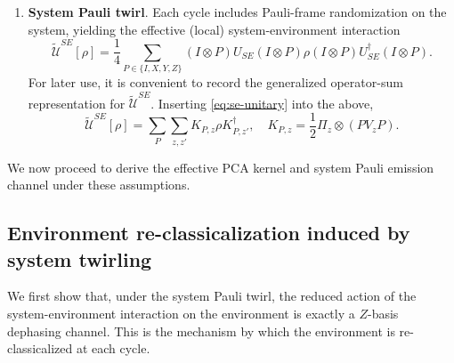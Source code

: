 \documentclass[
    aps,
    prx,
    reprint,
    superscriptaddress,
    longbibliography,
    nofootinbib,
    floatfix,
]{revtex4-2}
\begin{document}
\begin{enumerate}
    \item[(V)] \textbf{System Pauli twirl}.
    Each cycle includes Pauli-frame randomization on the system, yielding the effective (local) system-environment interaction
    \begin{equation}
        \widetilde{\mathcal{U}}^{SE}[\rho] = \frac{1}{4}\sum_{P\in\{I,X,Y,Z\}} (I \otimes P) U_{SE} (I \otimes P) \rho (I \otimes P) U_{SE}^\dagger (I \otimes P).
    \end{equation}
    For later use, it is convenient to record the generalized operator-sum representation for \(\widetilde{\mathcal{U}}^{SE}\). Inserting \cref{eq:se-unitary} into the above,
    \begin{equation}\label{eq:twirled-kraus-ops}
    \widetilde{\mathcal{U}}^{SE}[\rho] = \sum_P \sum_{z,z'} K_{P, z} \rho K_{P, z'}^\dagger, \quad K_{P, z} = \frac{1}{2} \Pi_z \otimes (P V_z P).
\end{equation}
\end{enumerate}
We now proceed to derive the effective PCA kernel and system Pauli emission channel under these assumptions.

\subsection{Environment re-classicalization induced by system twirling}\label{app:env-dephasing}
We first show that, under the system Pauli twirl, the reduced action of the system-environment interaction on the environment is exactly a \(Z\)-basis dephasing channel. This is the mechanism by which the environment is re-classicalized at each cycle.
\end{document}
